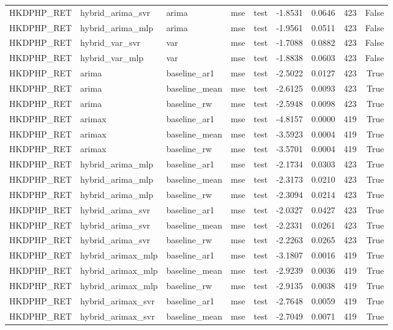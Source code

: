 \begin{tabular}{lllllrrrr}
HKDPHP_RET & hybrid_arima_svr & arima & mse & test & -1.8531 & 0.0646 & 423 & False \\
HKDPHP_RET & hybrid_arima_mlp & arima & mse & test & -1.9561 & 0.0511 & 423 & False \\
HKDPHP_RET & hybrid_var_svr & var & mse & test & -1.7088 & 0.0882 & 423 & False \\
HKDPHP_RET & hybrid_var_mlp & var & mse & test & -1.8838 & 0.0603 & 423 & False \\
HKDPHP_RET & arima & baseline_ar1 & mse & test & -2.5022 & 0.0127 & 423 & True \\
HKDPHP_RET & arima & baseline_mean & mse & test & -2.6125 & 0.0093 & 423 & True \\
HKDPHP_RET & arima & baseline_rw & mse & test & -2.5948 & 0.0098 & 423 & True \\
HKDPHP_RET & arimax & baseline_ar1 & mse & test & -4.8157 & 0.0000 & 419 & True \\
HKDPHP_RET & arimax & baseline_mean & mse & test & -3.5923 & 0.0004 & 419 & True \\
HKDPHP_RET & arimax & baseline_rw & mse & test & -3.5701 & 0.0004 & 419 & True \\
HKDPHP_RET & hybrid_arima_mlp & baseline_ar1 & mse & test & -2.1734 & 0.0303 & 423 & True \\
HKDPHP_RET & hybrid_arima_mlp & baseline_mean & mse & test & -2.3173 & 0.0210 & 423 & True \\
HKDPHP_RET & hybrid_arima_mlp & baseline_rw & mse & test & -2.3094 & 0.0214 & 423 & True \\
HKDPHP_RET & hybrid_arima_svr & baseline_ar1 & mse & test & -2.0327 & 0.0427 & 423 & True \\
HKDPHP_RET & hybrid_arima_svr & baseline_mean & mse & test & -2.2331 & 0.0261 & 423 & True \\
HKDPHP_RET & hybrid_arima_svr & baseline_rw & mse & test & -2.2263 & 0.0265 & 423 & True \\
HKDPHP_RET & hybrid_arimax_mlp & baseline_ar1 & mse & test & -3.1807 & 0.0016 & 419 & True \\
HKDPHP_RET & hybrid_arimax_mlp & baseline_mean & mse & test & -2.9239 & 0.0036 & 419 & True \\
HKDPHP_RET & hybrid_arimax_mlp & baseline_rw & mse & test & -2.9135 & 0.0038 & 419 & True \\
HKDPHP_RET & hybrid_arimax_svr & baseline_ar1 & mse & test & -2.7648 & 0.0059 & 419 & True \\
HKDPHP_RET & hybrid_arimax_svr & baseline_mean & mse & test & -2.7049 & 0.0071 & 419 & True \\

\end{tabular}
